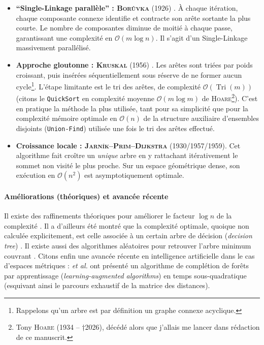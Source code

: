 \begin{itemize}
    \item \textbf{``Single-Linkage parallèle'' : \textsc{Borůvka}} (1926) \cite{Boruvka1926}. À chaque itération, chaque composante connexe identifie et contracte son arête sortante la plus courte. Le nombre de composantes diminue de moitié à chaque passe, garantissant une complexité en $\mathcal{O}(m \log n)$. Il s'agit d'un Single-Linkage massivement parallélisé.

    \item \textbf{Approche gloutonne : \textsc{Kruskal}} (1956) \cite{Kruskal1956}. Les arêtes sont triées par poids croissant, puis insérées séquentiellement sous réserve de ne former aucun cycle\footnote{Rappelons qu'un arbre est par définition un graphe connexe acyclique.}. L'étape limitante est le tri des arêtes, de complexité $\mathcal{O}(\operatorname{Tri}(m))$ (citons le \texttt{QuickSort} \cite{Hoare1962} en complexité moyenne $\mathcal O (m \log m)$ de \textsc{Hoare}\footnote{Tony \textsc{Hoare} (1934 -- †2026), décédé alors que j'allais me lancer dans rédaction de ce manuscrit.}). C'est en pratique la méthode la plus utilisée, tant pour sa simplicité que pour la complexité mémoire optimale en $\mathcal{O}(n)$ de la structure auxiliaire d'ensembles disjoints (\texttt{Union-Find}) \cite{Tarjan1975} utilisée une fois le tri des arêtes effectué.

    \item \textbf{Croissance locale : \textsc{Jarník}--\textsc{Prim}--\textsc{Dijkstra}} (1930/1957/1959). Cet algorithme fait croître un \emph{unique} arbre en y rattachant itérativement le sommet non visité le plus proche. Sur un espace géométrique dense, son exécution en $\mathcal{O}(n^2)$ est asymptotiquement optimale.
\end{itemize}

\paragraph{Améliorations (théoriques) et avancée récente}
Il existe des raffinements théoriques pour améliorer le facteur $\log n$ de la complexité \cite{ChazelleMST}. Il a d'ailleurs été montré que la complexité optimale, quoique non calculée explicitement, est celle associée à un certain arbre de décision (\emph{decision tree}) \cite{OptimalMST2002}.
Il existe aussi des algorithmes aléatoires pour retrouver l'arbre minimum couvrant \cite{RandomizedMST}. 
Citons enfin une avancée récente en intelligence artificielle dans le cas d'espaces métriques :  \emph{et al.} \cite{Veldt2025} ont présenté un algorithme de complétion de forêts par apprentissage (\emph{learning-augmented algorithms}) en temps sous-quadratique (esquivant ainsi le parcours exhaustif de la matrice des distances).



